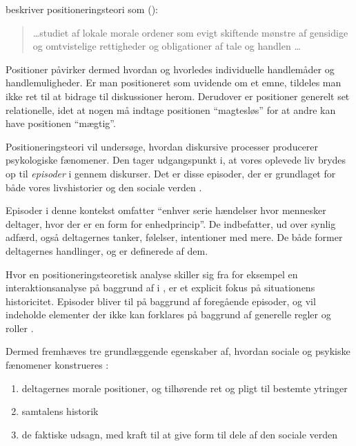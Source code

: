 \citeauthor{harrePositioningTheoryMoral1999} beskriver 
positioneringsteori som (\citeyear[s. 1, min oversættelse
]{harrePositioningTheoryMoral1999}):
\begin{quotation}
  \ldots studiet af lokale morale ordener som evigt skiftende 
  mønstre af gensidige og omtvistelige rettigheder og 
  obligationer af tale og handlen \ldots
\end{quotation}

Positioner påvirker dermed hvordan og hvorledes individuelle 
handlemåder og handlemuligheder. Er man positioneret som uvidende 
om et emne, tildeles man ikke ret til at bidrage til diskussioner 
herom. Derudover er positioner generelt set relationelle, idet at 
nogen må indtage positionen “magtesløs” for at andre kan have 
positionen “mægtig”.

Positioneringsteori vil undersøge, hvordan diskursive processer 
producerer psykologiske fænomener. Den tager udgangspunkt i, at 
vores oplevede liv brydes op til \emph{episoder} i gennem 
diskurser. Det er disse episoder, der er grundlaget for både vores
livshistorier og den sociale verden \autocite[s. 
4]{harrePositioningTheoryMoral1999}.

Episoder i denne kontekst omfatter “enhver serie hændelser hvor 
mennesker deltager, hvor der er en form for enhedprincip”. De 
indbefatter, ud over synlig adfærd, også deltagernes tanker, 
følelser, intentioner med mere. De både former deltagernes 
handlinger, og er definerede af dem.

Hvor en positioneringsteoretisk analyse skiller sig fra for 
eksempel en interaktionsanalyse på baggrund af 
\citeauthor{goffmanPresentationSelfEveryday1956} i
, er et explicit 
fokus på situationens historicitet. Episoder bliver til på 
baggrund af foregående episoder, og vil indeholde elementer der 
ikke kan forklares på baggrund af generelle regler og roller 
\autocite[s. 5-6]{harrePositioningTheoryMoral1999}.

Dermed fremhæves tre grundlæggende egenskaber af, hvordan sociale 
og psykiske fænomener konstrueres 
\autocite{harrePositioningTheoryMoral1999}:
\begin{enumerate}
    \item
        deltagernes morale positioner, og tilhørende ret og pligt 
        til bestemte ytringer
    \item
        samtalens historik
    \item
        de faktiske udsagn, med kraft til at give form til dele af 
        den sociale verden
\end{enumerate}

